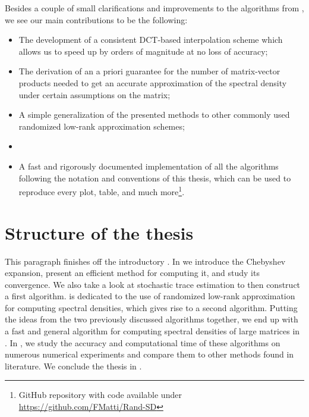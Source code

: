Besides a couple of small clarifications and improvements to the algorithms 
from \cite{lin2017randomized}, we see our main contributions to be the following:%

\begin{itemize}
    \item The development of a consistent \gls{DCT}-based interpolation scheme which allows us
          to speed up \cite[algorithm~5]{lin2017randomized} by orders of magnitude
          at no loss of accuracy;
    \item The derivation of an a priori guarantee for the number of matrix-vector
          products needed to get an accurate approximation of the spectral
          density under certain assumptions on the matrix;
    \item A simple generalization of the presented methods to other
          commonly used randomized low-rank approximation schemes;
    \item {}
    \item A fast and rigorously documented implementation of all the algorithms
          following the notation and conventions of this thesis, which can be used to
          reproduce every plot, table, and much more\footnote{GitHub repository with
          code available under \url{https://github.com/FMatti/Rand-SD}}.
\end{itemize}


\section{Structure of the thesis}
\label{sec:1-introduction-structure}

This paragraph finishes off the introductory .
In  we introduce the Chebyshev expansion, present an
efficient method for computing it, and study its convergence. We also take a
look at stochastic trace estimation to then construct a first algorithm.
 is dedicated to the use of randomized low-rank approximation
for computing spectral densities, which gives rise to a second algorithm.
Putting the ideas from the two previously discussed algorithms together,
we end up with a fast and general algorithm for computing spectral densities
of large matrices in . In ,
we study the accuracy and computational time of these algorithms on numerous
numerical experiments and compare them to other methods found in literature.
We conclude the thesis in .

